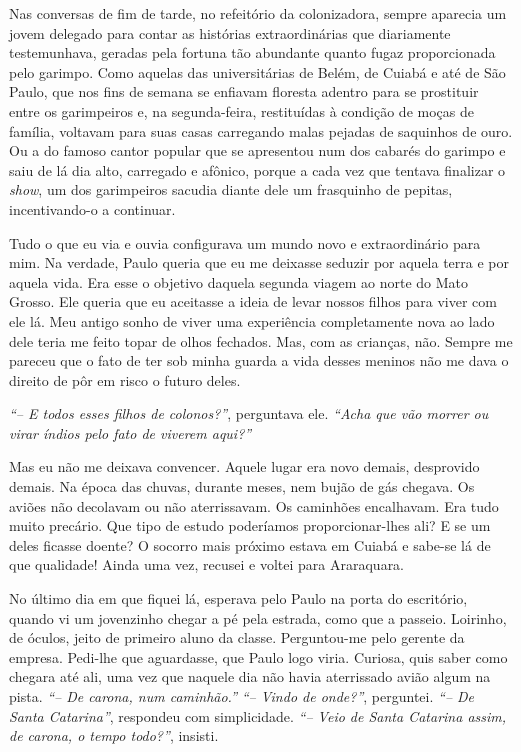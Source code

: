 Nas conversas de fim de tarde, no refeitório da colonizadora, sempre aparecia um jovem delegado para contar as histórias extraordinárias que diariamente testemunhava, geradas pela fortuna tão abundante quanto fugaz proporcionada pelo garimpo.
Como aquelas das universitárias de Belém, de Cuiabá e até de São Paulo, que nos fins de semana se enfiavam floresta adentro para se prostituir entre os garimpeiros e, na segunda-feira, restituídas à condição de moças de família, voltavam para suas casas carregando malas pejadas de saquinhos de ouro.
Ou a do famoso cantor popular que se apresentou num dos cabarés do garimpo e saiu de lá dia alto, carregado e afônico, porque a cada vez que tentava finalizar o \textit{show}, um dos garimpeiros sacudia diante dele um frasquinho de pepitas, incentivando-o a continuar.

Tudo o que eu via e ouvia configurava um mundo novo e extraordinário para mim.
Na verdade, Paulo queria que eu me deixasse seduzir por aquela terra e por aquela vida.
Era esse o objetivo daquela segunda viagem ao norte do Mato Grosso.
Ele queria que eu aceitasse a ideia de levar nossos filhos para viver com ele lá.
Meu antigo sonho de viver uma experiência completamente nova ao lado dele teria me feito topar de olhos fechados.
Mas, com as crianças, não.
Sempre me pareceu que o fato de ter sob minha guarda a vida desses meninos não me dava o direito de pôr em risco o futuro deles.

\textit{``-- E todos esses filhos de colonos?''}, perguntava ele.
\textit{``Acha que vão morrer ou virar índios pelo fato de viverem aqui?''} 

Mas eu não me deixava convencer.
Aquele lugar era novo demais, desprovido demais.
Na época das chuvas, durante meses, nem bujão de gás chegava.
Os aviões não decolavam ou não aterrissavam.
Os caminhões encalhavam.
Era tudo muito precário.
Que tipo de estudo poderíamos proporcionar-lhes ali? E se um deles ficasse doente? O socorro mais próximo estava em Cuiabá e sabe-se lá de que qualidade! Ainda uma vez, recusei e voltei para Araraquara.


No último dia em que fiquei lá, esperava pelo Paulo na porta do escritório, quando vi um jovenzinho chegar a pé pela estrada, como que a passeio.
Loirinho, de óculos, jeito de primeiro aluno da classe.
Perguntou-me pelo gerente da empresa.
Pedi-lhe que aguardasse, que Paulo logo viria.
Curiosa, quis saber como chegara até ali, uma vez que naquele dia não havia aterrissado avião algum na pista.
\textit{``-- De carona, num caminhão.''} 
\textit{``-- Vindo de onde?''}, perguntei.
 \textit{``-- De Santa Catarina''}, respondeu com simplicidade.
\textit{``-- Veio de Santa Catarina assim, de carona, o tempo todo?''}, insisti.
 
